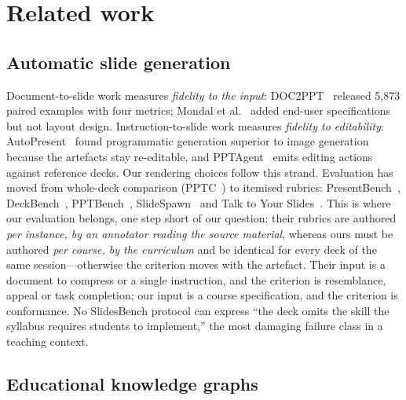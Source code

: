 \documentclass[review,12pt]{elsarticle}
\renewcommand{\_}{\kgunderscore\allowbreak}
\begin{document}
\section{Related work}

\subsection{Automatic slide generation}

Document-to-slide work measures \emph{fidelity to the input}:
DOC2PPT~\cite{fu2022doc2ppt} released 5{,}873 paired examples with four metrics;
Mondal et al.~\cite{mondal2024presentations} added end-user specifications but
not layout design. Instruction-to-slide work measures \emph{fidelity to
editability}: AutoPresent~\cite{ge2025autopresent} found programmatic generation
superior to image generation because the artefacts stay re-editable, and
PPTAgent~\cite{zheng2025pptagent} emits editing actions against reference decks.
Our rendering choices follow this strand. Evaluation has moved from whole-deck
comparison (PPTC~\cite{guo2024pptc}) to itemised rubrics:
PresentBench~\cite{presentbench2026}, DeckBench~\cite{deckbench2026},
PPTBench~\cite{pptbench2025}, SlideSpawn~\cite{slidespawn2024} and Talk to Your
Slides~\cite{jung2026talktoslides}. This is where our evaluation belongs, one
step short of our question: their rubrics are authored \emph{per instance, by
an annotator reading the source material}, whereas ours must be authored
\emph{per course, by the curriculum} and be identical for every deck of the
same session---otherwise the criterion moves with the artefact. Their input is
a document to compress or a single instruction, and the criterion is
resemblance, appeal or task completion; our input is a course specification,
and the criterion is conformance. No SlidesBench protocol can express ``the
deck omits the skill the syllabus requires students to implement,'' the most
damaging failure class in a teaching context.

\subsection{Educational knowledge graphs}
\end{document}

